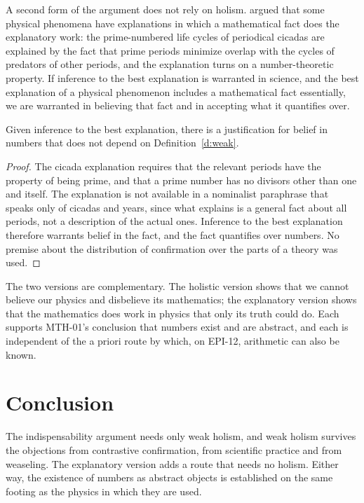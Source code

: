\documentclass{situationist-preprint}
\begin{document}
A second form of the argument does not rely on holism. \citet{Baker2005} argued that some physical phenomena have explanations in which a mathematical fact does the explanatory work: the prime-numbered life cycles of periodical cicadas are explained by the fact that prime periods minimize overlap with the cycles of predators of other periods, and the explanation turns on a number-theoretic property. If inference to the best explanation is warranted in science, and the best explanation of a physical phenomenon includes a mathematical fact essentially, we are warranted in believing that fact and in accepting what it quantifies over.

\begin{proposition}\label{p:expl}
Given inference to the best explanation, there is a justification for belief in numbers that does not depend on Definition~\ref{d:weak}.
\end{proposition}

\begin{proof}
The cicada explanation requires that the relevant periods have the property of being prime, and that a prime number has no divisors other than one and itself. The explanation is not available in a nominalist paraphrase that speaks only of cicadas and years, since what explains is a general fact about all periods, not a description of the actual ones. Inference to the best explanation therefore warrants belief in the fact, and the fact quantifies over numbers. No premise about the distribution of confirmation over the parts of a theory was used.
\end{proof}

The two versions are complementary. The holistic version shows that we cannot believe our physics and disbelieve its mathematics; the explanatory version shows that the mathematics does work in physics that only its truth could do. Each supports MTH-01's conclusion that numbers exist and are abstract, and each is independent of the a priori route by which, on EPI-12, arithmetic can also be known.

\section{Conclusion}

The indispensability argument needs only weak holism, and weak holism survives the objections from contrastive confirmation, from scientific practice and from weaseling. The explanatory version adds a route that needs no holism. Either way, the existence of numbers as abstract objects is established on the same footing as the physics in which they are used.
\end{document}
